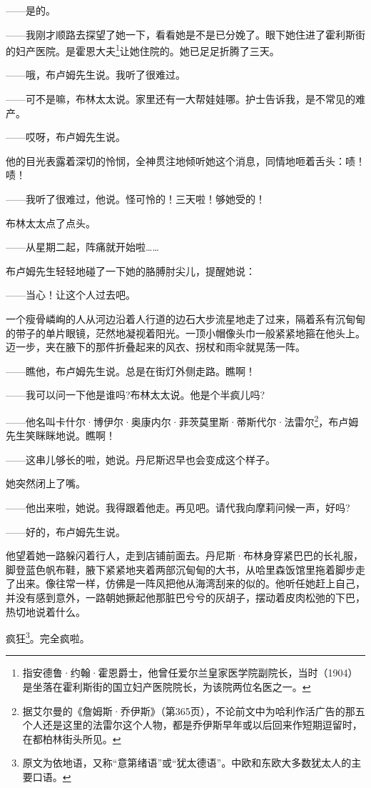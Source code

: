 \par ——是的。
\par ——我刚才顺路去探望了她一下，看看她是不是已分娩了。眼下她住进了霍利斯街的妇产医院。是霍恩大夫\footnote{指安德鲁·约翰·霍恩爵士，他曾任爱尔兰皇家医学院副院长，当时（1904）是坐落在霍利斯街的国立妇产医院院长，为该院两位名医之一。}让她住院的。她已足足折腾了三天。
\par ——哦，布卢姆先生说。我听了很难过。
\par ——可不是嘛，布林太太说。家里还有一大帮娃娃哪。护士告诉我，是不常见的难产。
\par ——哎呀，布卢姆先生说。
\par 他的目光表露着深切的怜悯，全神贯注地倾听她这个消息，同情地咂着舌头：啧！啧！
\par ——我听了很难过，他说。怪可怜的！三天啦！够她受的！
\par 布林太太点了点头。
\par ——从星期二起，阵痛就开始啦……
\par 布卢姆先生轻轻地碰了一下她的胳膊肘尖儿，提醒她说：
\par ——当心！让这个人过去吧。
\par 一个瘦骨嶙峋的人从河边沿着人行道的边石大步流星地走了过来，隔着系有沉甸甸的带子的单片眼镜，茫然地凝视着阳光。一顶小帽像头巾一般紧紧地箍在他头上。迈一步，夹在腋下的那件折叠起来的风衣、拐杖和雨伞就晃荡一阵。
\par ——瞧他，布卢姆先生说。总是在街灯外侧走路。瞧啊！
\par ——我可以问一下他是谁吗?布林太太说。他是个半疯儿吗?
\par ——他名叫卡什尔·博伊尔·奥康内尔·菲茨莫里斯·蒂斯代尔·法雷尔\footnote{据艾尔曼的《詹姆斯·乔伊斯》（第365页），不论前文中为哈利作活广告的那五个人还是这里的法雷尔这个人物，都是乔伊斯早年或以后回来作短期逗留时，在都柏林街头所见。}，布卢姆先生笑眯眯地说。瞧啊！
\par ——这串儿够长的啦，她说。丹尼斯迟早也会变成这个样子。
\par 她突然闭上了嘴。
\par ——他出来啦，她说。我得跟着他走。再见吧。请代我向摩莉问候一声，好吗?
\par ——好的，布卢姆先生说。
\par 他望着她一路躲闪着行人，走到店铺前面去。丹尼斯·布林身穿紧巴巴的长礼服，脚登蓝色帆布鞋，腋下紧紧地夹着两部沉甸甸的大书，从哈里森饭馆里拖着脚步走了出来。像往常一样，仿佛是一阵风把他从海湾刮来的似的。他听任她赶上自己，并没有感到意外，一路朝她撅起他那脏巴兮兮的灰胡子，摆动着皮肉松弛的下巴，热切地说着什么。
\par 疯狂\footnote{原文为依地语，又称“意第绪语”或“犹太德语”。中欧和东欧大多数犹太人的主要口语。}。完全疯啦。
